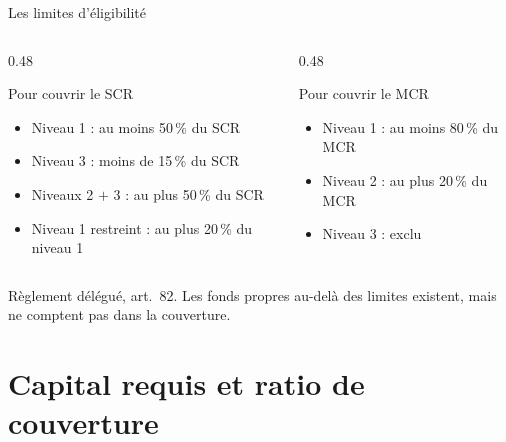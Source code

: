\documentclass[10pt,aspectratio=169]{beamer}
\begin{document}
\begin{frame}{Les limites d'éligibilité}
\begin{columns}[T]
\begin{column}{0.48\textwidth}
\begin{block}{Pour couvrir le SCR}
\begin{itemize}
  \item Niveau 1 : au moins 50\,\% du SCR
  \item Niveau 3 : moins de 15\,\% du SCR
  \item Niveaux 2 $+$ 3 : au plus 50\,\% du SCR
  \item Niveau 1 restreint : au plus 20\,\% du niveau 1
\end{itemize}
\end{block}
\end{column}
\begin{column}{0.48\textwidth}
\begin{block}{Pour couvrir le MCR}
\begin{itemize}
  \item Niveau 1 : au moins 80\,\% du MCR
  \item Niveau 2 : au plus 20\,\% du MCR
  \item Niveau 3 : exclu
\end{itemize}
\end{block}
\end{column}
\end{columns}
\vspace{0.3cm}
\small Règlement délégué, art.~82. Les fonds propres au-delà des limites existent, mais ne
comptent pas dans la couverture.
\end{frame}

\section{Capital requis et ratio de couverture}
\end{document}
